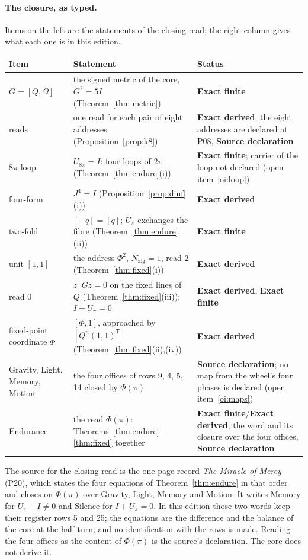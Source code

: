 \documentclass[11pt,a4paper]{article}
\newcommand{\tp}{^{\mathsf T}}
\newcommand{\Nalg}{N_{\mathrm{alg}}}\newcommand{\Fac}{\mathrm{Fac}_G}
\newcommand{\st}[1]{\textsf{\small\textbf{#1}}}
\newcommand{\Sfin}{\st{Exact finite}}\newcommand{\Sder}{\st{Exact derived}}
\newcommand{\Ssrc}{\st{Source declaration}}\newcommand{\Sint}{\st{Interface}}
\theoremstyle{plain}
\theoremstyle{definition}
\theoremstyle{remark}
\begin{document}
\paragraph{The closure, as typed.} Items on the left are the statements of the closing read; the right column gives what each one is in this edition.
\begin{center}\small
\begin{tabularx}{\linewidth}{@{}>{\raggedright\arraybackslash}p{2.9cm}>{\raggedright\arraybackslash}X>{\raggedright\arraybackslash}p{2.7cm}@{}}
\toprule
Item & Statement & Status\\\midrule
$G=[Q,\Omega]$ & the signed metric of the core, $G^2=5I$ (Theorem~\ref{thm:metric}) & \Sfin\\
28 reads & one read for each pair of eight addresses (Proposition~\ref{prop:k8}) & \Sder; the eight addresses are declared at P08, \Ssrc\\
$8\pi$ loop & $U_{8\pi}=I$: four loops of $2\pi$ (Theorem~\ref{thm:endure}(i)) & \Sfin; carrier of the loop not declared (open item~\ref{oi:loop})\\
four-form & $J^4=I$ (Proposition~\ref{prop:dinf}(i)) & \Sder\\
two-fold & $[-q]=[q]$; $U_\pi$ exchanges the fibre (Theorem~\ref{thm:endure}(ii)) & \Sfin\\
unit $[1,1]$ & the address $\Phi^2$, $\Nalg=1$, read $2$ (Theorem~\ref{thm:fixed}(i)) & \Sder\\
read $0$ & $z\tp Gz=0$ on the fixed lines of $Q$ (Theorem~\ref{thm:fixed}(iii)); $I+U_\pi=0$ & \Sder, \Sfin\\
fixed-point coordinate $\Phi$ & $[\Phi,1]$, approached by $[Q^n(1,1)\tp]$ (Theorem~\ref{thm:fixed}(ii),(iv)) & \Sder\\
Gravity, Light, Memory, Motion & the four offices of rows 9, 4, 5, 14 closed by $\Phi(\pi)$ & \Ssrc; no map from the wheel's four phases is declared (open item~\ref{oi:maps})\\
Endurance & the read $\Phi(\pi)$: Theorems~\ref{thm:endure}--\ref{thm:fixed} together & \Sfin/\Sder; the word and its closure over the four offices, \Ssrc\\\bottomrule
\end{tabularx}
\end{center}
The source for the closing read is the one-page record \emph{The Miracle of Mercy} (P20), which states the four equations of Theorem~\ref{thm:endure} in that order and closes on $\Phi(\pi)$ over Gravity, Light, Memory and Motion. It writes Memory for $U_\pi-I\ne0$ and Silence for $I+U_\pi=0$. In this edition those two words keep their register rows 5 and 25; the equations are the difference and the balance of the core at the half-turn, and no identification with the rows is made. Reading the four offices as the content of $\Phi(\pi)$ is the source's declaration. The core does not derive it.
\end{document}
